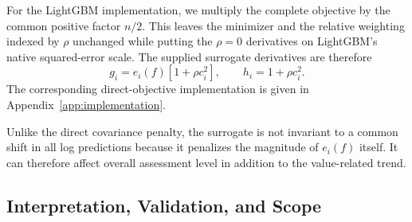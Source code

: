 \documentclass[10pt]{article}
\theoremstyle{definition}
\newcommand{\1}{\mathbf{1}}
\begin{document}

{For the LightGBM implementation, we multiply the complete objective by the common positive factor $n/2$. This leaves the minimizer and the relative weighting indexed by $\rho$ unchanged while putting the $\rho=0$ derivatives on LightGBM's native squared-error scale. The supplied surrogate derivatives are therefore
\[
g_i=e_i(f)\left[1+\rho c_i^2\right],
\qquad
h_i=1+\rho c_i^2.
\]
The corresponding direct-objective implementation is given in Appendix~\ref{app:implementation}.}


{Unlike the direct covariance penalty, the surrogate is not invariant to a common shift in all log predictions because it penalizes the magnitude of $e_i(f)$ itself. It can therefore affect overall assessment level in addition to the value-related trend. %
}


\subsection{{Interpretation, Validation, and Scope}}
\label{subsec:correction_scope}

\end{document}
